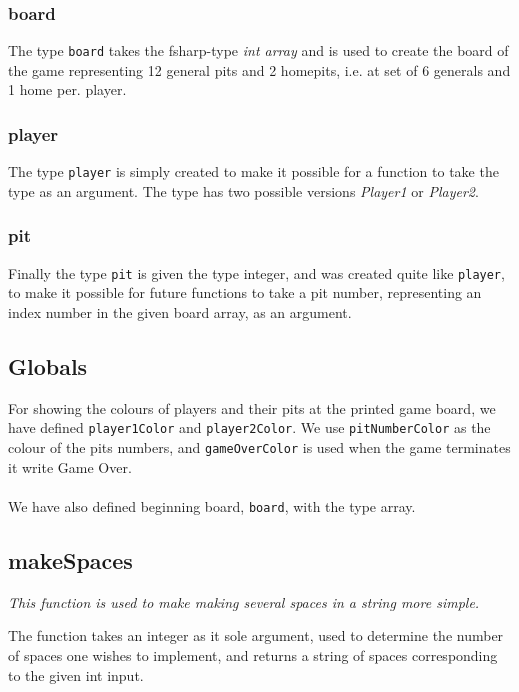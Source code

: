\documentclass[a4paper]{report}
\begin{document}
\lstset{language=FSharp}


\subsubsection*{board}
The type \texttt{board} takes the fsharp-type \textsl{int array} and is used to create the board of the game representing 12 general pits and 2 homepits, i.e. at set of 6 generals and 1 home per. player.

\subsubsection*{player}
The type \texttt{player} is simply created to make it possible for a function to take the type as an argument. The type has two possible versions \textsl{Player1} or \textsl{Player2}.

\subsubsection*{pit}
Finally the type \texttt{pit} is given the type integer, and was created quite like \texttt{player}, to make it possible for future functions to take a pit number, representing an index number in the given board array, as an argument.

\subsection*{Globals}
For showing the colours of players and their pits at the printed game board, we have defined \texttt{player1Color} and \texttt{player2Color}. We use \texttt{pitNumberColor} as the colour of the pits numbers, and \texttt{gameOverColor} is used when the game terminates it write Game Over.
\\\\
We have also defined beginning board, \texttt{board}, with the type array.

\subsection*{makeSpaces}
{\it This function is used to make making several spaces in a string more simple.}

The function takes an integer as it sole argument, used to determine the number of spaces one wishes to implement, and returns a string of spaces corresponding to the given int input.
\end{document}
